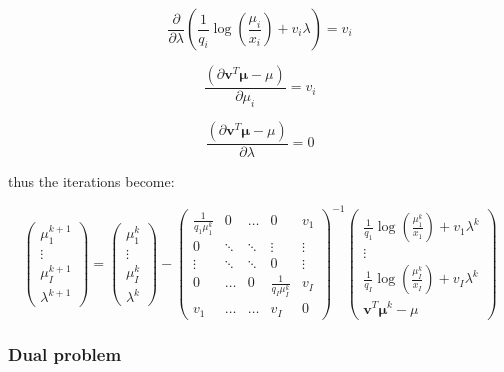 \documentclass{tex/note}
\begin{document}
\begin{equation*}
\frac{\partial}{\partial \lambda} \left( \frac{1}{q_i} \log \left( \frac{\mu_i}{x_i} \right) + v_i \lambda \right) = v_i
\end{equation*}

\begin{equation*}
\frac{\left( \partial \bm{v}^T \bm{\mu} - \mu \right)}{\partial \mu_i} = v_i
\end{equation*}

\begin{equation*}
\frac{\left( \partial \bm{v}^T \bm{\mu} - \mu \right)}{\partial \lambda} = 0
\end{equation*}

thus the iterations become:

\begin{equation*}
\begin{pmatrix} \mu_1^{k + 1} \\ \vdots \\ \mu_I^{k + 1} \\ \lambda^{k + 1} \end{pmatrix} = \begin{pmatrix} \mu_1^k \\ \vdots \\ \mu_I^k \\ \lambda^k \end{pmatrix} - \begin{pmatrix} \frac{1}{q_1 \mu_1^k} & 0 & \hdots & 0 &  v_1 \\ 0 & \ddots & \ddots & \vdots & \vdots \\ \vdots & \ddots & \ddots & 0 & \vdots \\ 0 & \hdots & 0 & \frac{1}{q_I \mu_I^k} & v_I \\ v_1 & \hdots & \hdots & v_I & 0 \end{pmatrix} ^{-1} \begin{pmatrix} \frac{1}{q_1} \log \left( \frac{\mu_1^k}{x_ 1} \right) + v_1 \lambda^k \\ \vdots \\ \frac{1}{q_I} \log \left( \frac{\mu_I^k}{x_ I} \right) + v_I \lambda^k \\ \bm{v}^T \bm{\mu}^k - \mu \end{pmatrix}
\end{equation*}

\subsubsection{Dual problem}
\end{document}
